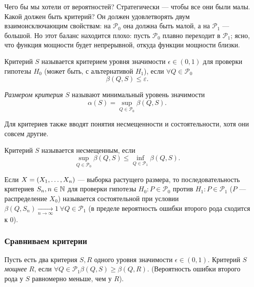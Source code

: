 Чего бы мы хотели от вероятностей? Стратегически --- чтобы все они были малы. Какой должен быть критерий? Он должен удовлетворять двум взаимоисключающим свойствам: на \(\mathcal{P}_0\) она должна быть малой, а на \(\mathcal{P}_1\) --- большой. Но этот баланс находится плохо: пусть \(\mathcal{P}_0\) плавно переходит в \(\mathcal{P}_1\); ясно, что функция мощности будет непрерывной, откуда функции мощности близки.

\begin{definition}
    Критерий \(S\) называется критерием уровня значимости \(\epsilon \in (0, 1)\) для проверки гипотезы \(H_0\) (может быть, с альтернативой \(H_1\)), если \(\forall Q \in \mathcal{P}_0\)
    \begin{displaymath}
        \beta(Q, S) \leq \varepsilon.
    \end{displaymath}
\end{definition}

\begin{definition}
    \textit{Размером критерия \(S\)} называют минимальный уровень значимости
    \begin{displaymath}
        \alpha(S) = \sup_{Q \in \mathcal{P}_0} \beta(Q, S).
    \end{displaymath}
\end{definition}

Для критериев также вводят понятия несмещенности и состоятельности, хотя они совсем другие.

\begin{definition}
    Критерий \(S\) называется несмещенным, если 
    \begin{displaymath}
        \sup_{Q \in \mathcal{P}_0} \beta(Q, S) \leq \inf_{Q \in \mathcal{P}_1} \beta(Q, S).
    \end{displaymath}
\end{definition}

\begin{definition}
    Если \(X = \left(X_1, \ldots, X_n\right)\) --- выборка растущего размера, то последовательность критериев \(S_n, n \in \mathbb{N}\) для проверки гипотезы \(H_0: P \in \mathcal{P}_0\) против \(H_1: P \in \mathcal{P}_1\) (\(P\) --- распределение \(X_0\)) называется состоятельной при условии \(\beta(Q, S_n) \underset{n \to \infty}\to 1 ~ \forall Q\in \mathcal{P}_1\) (в пределе вероятность ошибки второго рода сходится к 0).
\end{definition}

\subsubsection{Сравниваем критерии}
\begin{definition}
    Пусть есть два критерия \(S, R\) одного уровня значимости \(\epsilon \in (0, 1)\). Критерий \(S\) \textit{мощнее} \(R\), если \(\forall Q \in \mathcal{P}_1 \beta(Q, S) \geq \beta(Q, R)\). (Вероятность ошибки второго рода у \(S\) равномерно меньше, чем у \(R\)).
\end{definition}

